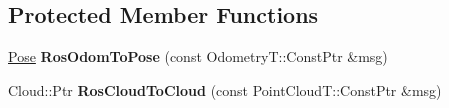 \subsection*{Protected Member Functions}
\begin{DoxyCompactItemize}
\item 
\mbox{\label{classdepth__clustering_1_1CloudOdomRosSubscriber_a2a5fac22f067b9cbfd395814c6939d8a}} 
\hyperlink{classdepth__clustering_1_1Pose}{Pose} {\bfseries Ros\+Odom\+To\+Pose} (const Odometry\+T\+::\+Const\+Ptr \&msg)
\item 
\mbox{\label{classdepth__clustering_1_1CloudOdomRosSubscriber_ad80bb8e5ba1f5f21221233145337c5eb}} 
Cloud\+::\+Ptr {\bfseries Ros\+Cloud\+To\+Cloud} (const Point\+Cloud\+T\+::\+Const\+Ptr \&msg)
\end{DoxyCompactItemize}
